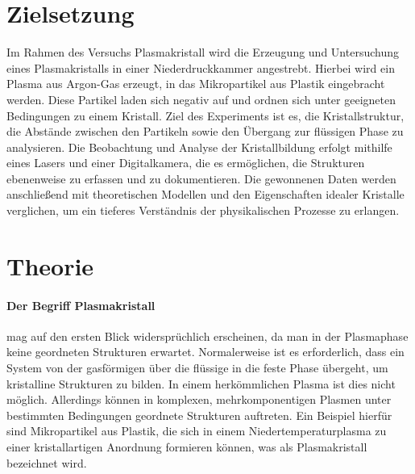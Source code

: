 \documentclass[12pt,a4paper,ngerman]{article}
\begin{document}
\setcounter{secnumdepth}{3}
\setcounter{tocdepth}{3}
\tableofcontents


	
\section*{Zielsetzung}%
Im Rahmen des Versuchs \glqq{}Plasmakristall\grqq{} wird die Erzeugung und Untersuchung eines Plasmakristalls in einer Niederdruckkammer angestrebt. Hierbei wird ein Plasma aus Argon-Gas erzeugt, in das Mikropartikel aus Plastik eingebracht werden. Diese Partikel laden sich negativ auf und ordnen sich unter geeigneten Bedingungen zu einem Kristall. Ziel des Experiments ist es, die Kristallstruktur, die Abstände zwischen den Partikeln sowie den Übergang zur flüssigen Phase zu analysieren. Die Beobachtung und Analyse der Kristallbildung erfolgt mithilfe eines Lasers und einer Digitalkamera, die es ermöglichen, die Strukturen ebenenweise zu erfassen und zu dokumentieren. Die gewonnenen Daten werden anschließend mit theoretischen Modellen und den Eigenschaften idealer Kristalle verglichen, um ein tieferes Verständnis der physikalischen Prozesse zu erlangen.

\section{Theorie}
\paragraph*{Der Begriff \glqq{}Plasmakristall\grqq{}} mag auf den ersten Blick widersprüchlich erscheinen, da man in der Plasmaphase keine geordneten Strukturen erwartet. Normalerweise ist es erforderlich, dass ein System von der gasförmigen über die flüssige in die feste Phase übergeht, um kristalline Strukturen zu bilden. In einem herkömmlichen Plasma ist dies nicht möglich. Allerdings können in komplexen, mehrkomponentigen Plasmen unter bestimmten Bedingungen geordnete Strukturen auftreten. Ein Beispiel hierfür sind Mikropartikel aus Plastik, die sich in einem Niedertemperaturplasma zu einer kristallartigen Anordnung formieren können, was als Plasmakristall bezeichnet wird.
\end{document}
